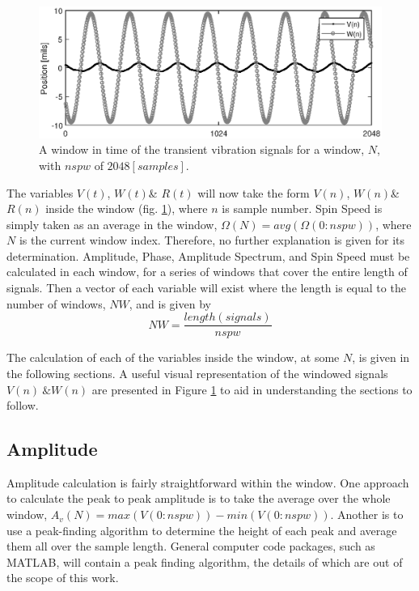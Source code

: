\begin{figure}
	\centering
	\includegraphics{./figures/SSTime.eps}
	\caption{A window in time of the transient vibration signals for a window, $ N $, with $ nspw $ of $ 2048[samples] $.}
	\label{fig:WindowedData}
\end{figure}
The variables $ V(t) $, $ W(t) $\& $ R(t) $ will now take the form $ V(n) $, $ W(n) $\& $ R(n) $ inside the window (fig. \ref{fig:WindowedData}), where $ n $ is sample number. Spin Speed is simply taken as an average in the window, $ \Omega(N)=avg(\Omega(0:nspw)) $, where $ N $ is the current window index. Therefore, no further explanation is given for its determination. Amplitude, Phase, Amplitude Spectrum, and Spin Speed must be calculated in each window, for a series of windows that cover the entire length of signals. Then a vector of each variable will exist where the length is equal to the number of windows, $ NW $, and is given by
\begin{equation*}
NW = \frac{length(signals)}{nspw}
\end{equation*}\par 
The calculation of each of the variables inside the window, at some $ N $, is given in the following sections. A useful visual representation of the windowed signals $ V(n)\ \& W(n) $ are presented in Figure \ref{fig:WindowedData} to aid in understanding the sections to follow.
\subsection{Amplitude}
Amplitude calculation is fairly straightforward within the window. One approach to calculate the peak to peak amplitude is to take the average over the whole window, $ A_v(N) = max(V(0:nspw))-min(V(0:nspw)) $. Another is to use a peak-finding algorithm to determine the height of each peak and average them all over the sample length. General computer code packages, such as MATLAB,  will contain a peak finding algorithm, the details of which are out of the scope of this work.

